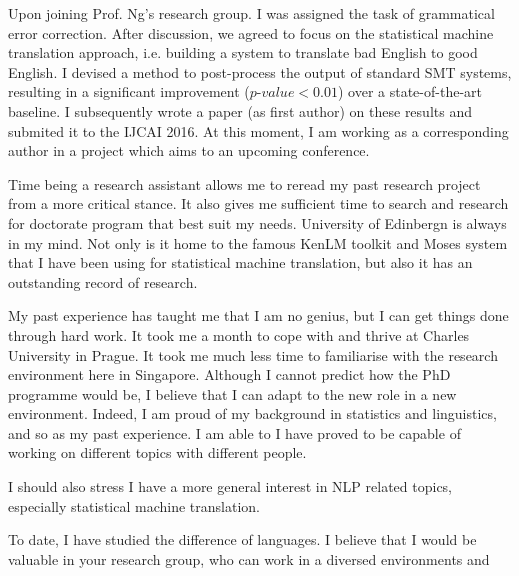 \documentclass[a4paper, 11pt]{scrartcl}
\begin{document}
Upon joining Prof. Ng's research group. I was assigned the task of grammatical error correction.
After discussion, we agreed to focus on the statistical machine translation approach, i.e. building a system to translate bad English to good English. 
I devised a method to post-process the output of standard SMT systems, resulting in a significant improvement ($p\mbox{-}value < 0.01$) over a state-of-the-art baseline. 
I subsequently wrote a paper (as first author) on these results and submited it to the IJCAI 2016. 
At this moment, I am working as a corresponding author in a project which aims to an upcoming conference.

Time being a research assistant allows me to reread my past research project from a more critical stance. It also gives me sufficient time to search and research for doctorate program that best suit my needs.
University of Edinbergn is always in my mind. Not only is it home to the famous KenLM toolkit and Moses system that I have been using for statistical machine translation, but also it has an outstanding record of research.


My past experience has taught me that I am no genius, but I can get things done through hard work.
It took me a month to cope with and thrive at Charles University in Prague.
It took me much less time to familiarise with the research environment here in Singapore.
Although I cannot predict how the PhD programme would be, I believe that I can adapt to the new role in a new environment. 
Indeed, I am proud of my background in statistics and linguistics, and so as my past experience. 
I am able to 
I have proved to be capable of working on different topics with different people.

I should also stress I have a more general interest in NLP related topics, especially statistical machine translation.

To date, I have studied the difference of languages.  
I believe that I would be valuable in your research group, who can work in a diversed environments and 
\end{document}
